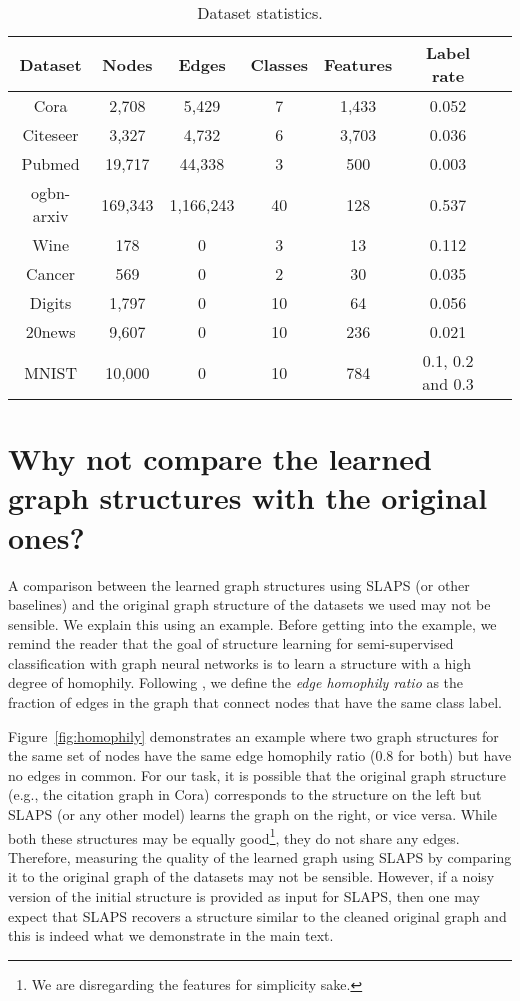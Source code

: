 \documentclass{article}
\begin{document}
\begin{table*}
\caption{Dataset statistics.}
\label{tab:datasets}
\begin{center}
\begin{tabular}{c|cccccc}
Dataset & Nodes & Edges & Classes & Features & Label rate \\ \hline
Cora & 2,708 & 5,429 & 7 & 1,433 & 0.052 \\
Citeseer & 3,327 & 4,732 & 6 & 3,703 & 0.036\\
Pubmed & 19,717 & 44,338 & 3 & 500 & 0.003\\
ogbn-arxiv & 169,343 & 1,166,243 & 40 & 128 & 0.537 \\
Wine & 178 & 0 & 3 & 13 & 0.112\\
Cancer & 569 & 0 & 2 & 30 & 0.035\\
Digits & 1,797 & 0 & 10 & 64 & 0.056\\
20news & 9,607 & 0 & 10 & 236 & 0.021\\
MNIST & 10,000 & 0 & 10 & 784 & 0.1, 0.2 and 0.3 \\
\end{tabular}
\end{center}
\end{table*}

\section{Why not compare the learned graph structures with the original ones?}
A comparison between the learned graph structures using SLAPS (or other baselines) and the original graph structure of the datasets we used may not be sensible. We explain this using an example. Before getting into the example, 
we remind the reader that the goal of structure learning for semi-supervised classification with graph neural networks is to learn a structure with a high degree of homophily. Following \cite{zhu2020beyond}, we define the \emph{edge homophily ratio} as the fraction of edges in the
graph that connect nodes that have the same class label. 

Figure~\ref{fig:homophily} demonstrates an example where two graph structures for the same set of nodes have the same edge homophily ratio (0.8 for both) but have no edges in common. For our task, it is possible that the original graph structure (e.g., the citation graph in Cora) corresponds to the structure on the left but SLAPS (or any other model) learns the graph on the right, or vice versa. While both these structures may be equally good\footnote{We are disregarding the features for simplicity sake.}, they do not share any edges. Therefore, measuring the quality of the learned graph using SLAPS by comparing it to the original graph of the datasets may not be sensible. However, if a noisy version of the initial structure is provided as input for SLAPS, then one may expect that SLAPS recovers a structure similar to the cleaned original graph and this is indeed what we demonstrate in the main text.
\end{document}
